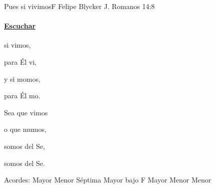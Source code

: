 \documentclass[12pt, spanish]{book}
\begin{document}
    \begin{song}{Pues si vivimos}{F}
        {\SBPubDom} %
        {Felipe Blycker J.}
        {Romanos 14:8} %
        {}
        \ifChordBk
        \paragraph{\mbox{}\hfill\protect\href{https://open.spotify.com/intl-es/track/43sOtsJyspONgyzEVbsZsp}{Escuchar}\mbox{}\hfill}
        \fi


        \begin{SBOpGroup}
             si vimos,

            para Él vi,

            y si momos,

            para Él mo.
        \end{SBOpGroup}

        \begin{SBChorus}
            Sea que vimos

            o que mumos,

            somos del Se,

            somos del Se.
        \end{SBChorus}

        \ifChordBk
        \begin{SBOpGroup}
            Acordes:\break
             Mayor \hfill
             Menor \hfill\null\break
             S\'eptima \hfill
             Mayor bajo F \hfill\null\break
             Mayor \hfill
             Menor \hfill\null\break
             Menor \hfill\null\break
        \end{SBOpGroup}
        \fi
    \end{song}
\end{document}
